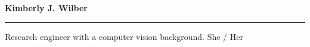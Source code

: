 \documentclass[10pt,letterpaper]{article}
\begin{document}
\thispagestyle{plain}
\begin{minipage}{0.60\textwidth}
  \flushleft
{\bfseries\Huge Kimberly J. Wilber}
\vspace{-0.8em}
\rule[0.7em]{\linewidth}{0.5mm}
Research engineer with a computer vision background.
\hfill {She / Her}
\end{minipage}
\hfill
\begin{minipage}[ht]{0.38\textwidth}
\end{minipage}
\end{document}
